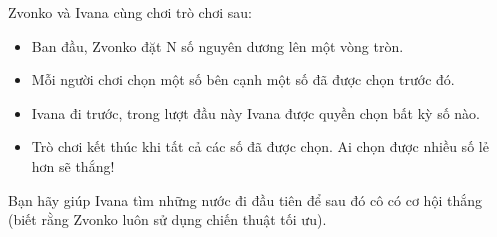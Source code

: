 Zvonko và Ivana cùng chơi trò chơi sau:  
\begin{itemize}
	\item     Ban đầu, Zvonko đặt N số nguyên dương lên một vòng tròn.   
	\item     Mỗi người chơi chọn một số bên cạnh một số đã được chọn trước đó.   
	\item     Ivana đi trước, trong lượt đầu này Ivana được quyền chọn bất kỳ số nào.   
	\item     Trò chơi kết thúc khi tất cả các số đã được chọn. Ai chọn được nhiều số lẻ hơn sẽ thắng!   
\end{itemize}

   Bạn hãy giúp Ivana tìm những nước đi đầu tiên để sau đó cô có cơ hội thắng (biết rằng Zvonko luôn sử dụng chiến thuật tối ưu).